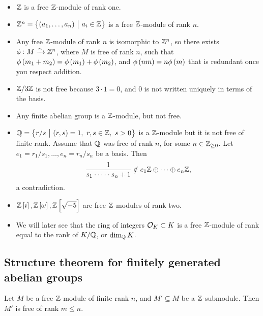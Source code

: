 \begin{example*}
\hfill
\begin{itemize}
\item $ \mathbb{Z} $ is a free $ \mathbb{Z} $-module of rank one.
\item $ \ZZ^n = \cbr{\br{a_1, \dots, a_n} \st a_i \in \ZZ} $ is a free $ \mathbb{Z} $-module of rank $ n $.
\item Any free $ \mathbb{Z} $-module of rank $ n $ is isomorphic to $ \mathbb{Z}^n $, so there exists $ \phi : M \xrightarrow{\sim} \mathbb{Z}^n $, where $ M $ is free of rank $ n $, such that $ \phi\br{m_1 + m_2} = \phi\br{m_1} + \phi\br{m_2} $, and $ \phi\br{nm} = n\phi\br{m} $ that is redundant once you respect addition.
\item $ \mathbb{Z} / 3\mathbb{Z} $ is not free because $ 3 \cdot 1 = 0 $, and $ 0 $ is not written uniquely in terms of the basis.
\item Any finite abelian group is a $ \mathbb{Z} $-module, but not free.
\item $ \QQ = \cbr{r / s \st \br{r, s} = 1, \ r, s \in \ZZ, \ s > 0} $ is a $ \mathbb{Z} $-module but it is not free of finite rank. Assume that $ \mathbb{Q} $ was free of rank $ n $, for some $ n \in \mathbb{Z}_{\ge 0} $. Let $ e_1 = r_1 / s_1, \dots, e_n = r_n / s_n $ be a basis. Then
$$ \dfrac{1}{s_1 \cdot \dots \cdot s_n + 1} \notin e_1\mathbb{Z} \oplus \dots \oplus e_n\mathbb{Z}, $$
a contradiction.
\item $ \ZZ\sbr{i}, \ZZ\sbr{\omega}, \ZZ\sbr{\sqrt{-5}} $ are free $ \mathbb{Z} $-modules of rank two.
\item We will later see that the ring of integers $ \mathcal{O}_K \subset K $ is a free $ \mathbb{Z} $-module of rank equal to the rank of $ K / \mathbb{Q} $, or $ \dim_{\mathbb{Q}} K $.
\end{itemize}
\end{example*}

\pagebreak

\subsection{Structure theorem for finitely generated abelian groups}

\begin{theorem}
Let $ M $ be a free $ \mathbb{Z} $-module of finite rank $ n $, and $ M' \subseteq M $ be a $ \mathbb{Z} $-submodule. Then $ M' $ is free of rank $ m \le n $.
\end{theorem}

